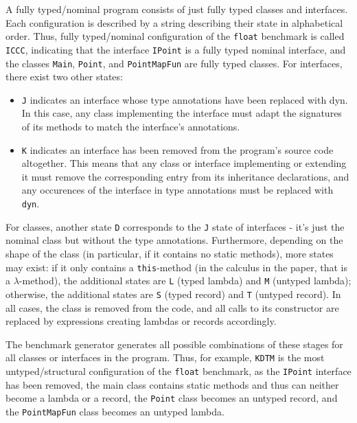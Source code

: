 \documentclass{article}
\begin{document}
A fully typed/nominal program consists of just fully typed classes and interfaces.
Each configuration is described by a string describing their state in alphabetical order.
Thus, fully typed/nominal configuration of the \texttt{float} benchmark is called \texttt{ICCC}, indicating that the interface \texttt{IPoint} is a fully typed nominal interface, and the classes \texttt{Main}, \texttt{Point}, and \texttt{PointMapFun} are fully typed classes.
For interfaces, there exist two other states:
\begin{itemize}
\item \texttt{J} indicates an interface whose type annotations have been replaced with dyn.
In this case, any class implementing the interface must adapt the signatures of its methods to match the interface's annotations.
\item \texttt{K} indicates an interface has been removed from the program's source code altogether.
This means that any class or interface implementing or extending it must remove the corresponding entry from its inheritance declarations, and any occurences of the interface in type annotations must be replaced with \texttt{dyn}.
\end{itemize}

For classes, another state \texttt{D} corresponds to the \texttt{J} state of interfaces - it's just the nominal class but without the type annotations.
Furthermore, depending on the shape of the class (in particular, if it contains no static methods), more states may exist:
if it only contains a \texttt{this}-method (in the calculus in the paper, that is a $\lambda$-method), the additional states are \texttt{L} (typed lambda) and \texttt{M} (untyped lambda); otherwise, the additional states are \texttt{S} (typed record) and \texttt{T} (untyped record).
In all cases, the class is removed from the code, and all calls to its constructor are replaced by expressions creating lambdas or records accordingly.

The benchmark generator generates all possible combinations of these stages for all classes or interfaces in the program.
Thus, for example, \texttt{KDTM} is the most untyped/structural configuration of the \texttt{float} benchmark, as the \texttt{IPoint} interface has been removed, the main class contains static methods and thus can neither become a lambda or a record, the \texttt{Point} class becomes an untyped record, and the \texttt{PointMapFun} class becomes an untyped lambda.
\end{document}
